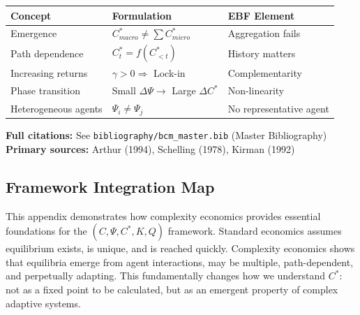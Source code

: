\begin{tcolorbox}[colback=yellow!5!white, colframe=yellow!75!black,
    title=\textbf{Quick Reference: Key Concepts}]

\renewcommand{\arraystretch}{1.3}
\begin{tabular}{@{}p{4cm}p{5cm}p{4cm}@{}}
\toprule
\textbf{Concept} & \textbf{Formulation} & \textbf{EBF Element} \\
\midrule
Emergence & $C^*_{macro} \neq \sum C^*_{micro}$ & Aggregation fails \\
Path dependence & $C^*_t = f(C^*_{<t})$ & History matters \\
Increasing returns & $\gamma > 0 \Rightarrow$ Lock-in & Complementarity \\
Phase transition & Small $\Delta\Psi \to$ Large $\Delta C^*$ & Non-linearity \\
Heterogeneous agents & $\Psi_i \neq \Psi_j$ & No representative agent \\
\bottomrule
\end{tabular}

\end{tcolorbox}

\noindent\textbf{Full citations:} See \texttt{bibliography/bcm\_master.bib} (Master Bibliography) \\
\textbf{Primary sources:} Arthur (1994), Schelling (1978), Kirman (1992)

\vspace{1em}

\subsection{Framework Integration Map}

This appendix demonstrates how complexity economics provides essential 
foundations for the $(C, \Psi, C^*, K, Q)$ framework. Standard economics 
assumes equilibrium exists, is unique, and is reached quickly. Complexity 
economics shows that equilibria emerge from agent interactions, may be 
multiple, path-dependent, and perpetually adapting. This fundamentally 
changes how we understand $C^*$: not as a fixed point to be calculated, 
but as an emergent property of complex adaptive systems.

